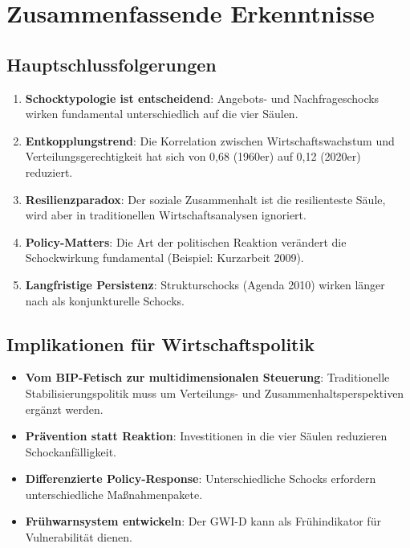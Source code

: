 \section{Zusammenfassende Erkenntnisse}

\subsection{Hauptschlussfolgerungen}

\begin{enumerate}
\item \textbf{Schocktypologie ist entscheidend}: Angebots- und Nachfrageschocks wirken fundamental unterschiedlich auf die vier Säulen.

\item \textbf{Entkopplungstrend}: Die Korrelation zwischen Wirtschaftswachstum und Verteilungsgerechtigkeit hat sich von 0,68 (1960er) auf 0,12 (2020er) reduziert.

\item \textbf{Resilienzparadox}: Der soziale Zusammenhalt ist die resilienteste Säule, wird aber in traditionellen Wirtschaftsanalysen ignoriert.

\item \textbf{Policy-Matters}: Die Art der politischen Reaktion verändert die Schockwirkung fundamental (Beispiel: Kurzarbeit 2009).

\item \textbf{Langfristige Persistenz}: Strukturschocks (Agenda 2010) wirken länger nach als konjunkturelle Schocks.
\end{enumerate}

\subsection{Implikationen für Wirtschaftspolitik}

\begin{itemize}
\item \textbf{Vom BIP-Fetisch zur multidimensionalen Steuerung}: Traditionelle Stabilisierungspolitik muss um Verteilungs- und Zusammenhaltsperspektiven ergänzt werden.

\item \textbf{Prävention statt Reaktion}: Investitionen in die vier Säulen reduzieren Schockanfälligkeit.

\item \textbf{Differenzierte Policy-Response}: Unterschiedliche Schocks erfordern unterschiedliche Maßnahmenpakete.

\item \textbf{Frühwarnsystem entwickeln}: Der GWI-D kann als Frühindikator für Vulnerabilität dienen.
\end{itemize}

